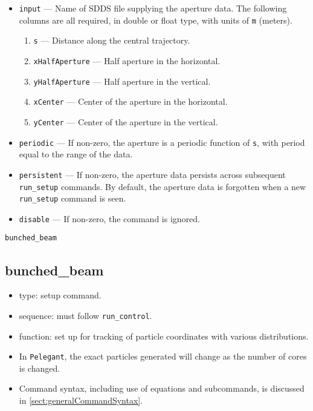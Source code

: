 \documentclass[11pt]{article}
\begin{document}
\begin{itemize}
\item \verb|input| --- Name of SDDS file supplying the aperture data.  The following columns are
  all required, in double or float type, with units of \verb|m| (meters).
  \begin{enumerate}
    \item \verb|s| --- Distance along the central trajectory.  
    \item \verb|xHalfAperture| --- Half aperture in the horizontal. 
    \item \verb|yHalfAperture| --- Half aperture in the vertical.
    \item \verb|xCenter| --- Center of the aperture in the horizontal.
    \item \verb|yCenter| --- Center of the aperture in the vertical.
  \end{enumerate}
\item \verb|periodic| --- If non-zero, the aperture is a periodic function of \verb|s|, with period equal
  to the range of the data.
\item \verb|persistent| --- If non-zero, the aperture data persists across subsequent \verb|run_setup| commands.
  By default, the aperture data is forgotten when a new \verb|run_setup| command is seen.
\item \verb|disable| --- If non-zero, the command is ignored.
\end{itemize}

\newpage
\begin{center}{\Large\verb|bunched_beam|}\end{center}
\subsection{bunched\_beam \label{subsec:bunchedbeam}}

\begin{itemize}
\item type: setup command.
\item sequence: must follow \verb|run_control|.
\item function: set up for tracking of particle coordinates with various distributions.
\item In \verb|Pelegant|, the exact particles generated will change as the number of cores is changed.
\item Command syntax, including use of equations and subcommands, is discussed in \ref{sect:generalCommandSyntax}.
\end{itemize}
\end{document}
